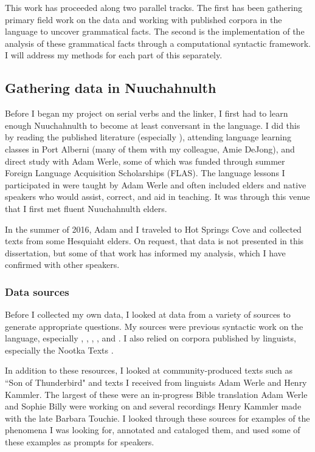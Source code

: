 This work has proceeded along two parallel tracks. The first has been gathering primary field work on the data and working with published corpora in the language to uncover grammatical facts. The second is the implementation of the analysis of these grammatical facts through a computational syntactic framework. I will address my methods for each part of this separately.

\subsection{Gathering data in Nuuchahnulth} \label{sec:method:ncn}

Before I began my project on serial verbs and the linker, I first had to learn enough Nuuchahnulth to become at least conversant in the language. I did this by reading the published literature (especially \citealt{sapir1939}), attending language learning classes in Port Alberni (many of them with my colleague, Amie DeJong), and direct study with Adam Werle, some of which was funded through summer Foreign Language Acquisition Scholarships (FLAS). The language lessons I participated in were taught by Adam Werle and often included elders and native speakers who would assist, correct, and aid in teaching. It was through this venue that I first met fluent Nuuchahnulth elders.

In the summer of 2016, Adam and I traveled to Hot Springs Cove and collected texts from some Hesquiaht elders. On request, that data is not presented in this dissertation, but some of that work has informed my analysis, which I have confirmed with other speakers.

\subsubsection{Data sources} \label{sec:method:sources}

Before I collected my own data, I looked at data from a variety of sources to generate appropriate questions. My sources were previous syntactic work on the language, especially \cite{jacobsen1993}, \cite{nakayama2001}, \cite{wojdak2003}, \cite{waldie2004}, and \cite{woo2007b}. I also relied on corpora published by linguists, especially the Nootka Texts \citep{sapir1924, sapir1939, sapir1955, whalingindians2000, whalingindians2004, whalingindians2009}.

In addition to these resources, I looked at community-produced texts such as ``Son of Thunderbird" and texts I received from linguists Adam Werle and Henry Kammler. The largest of these were an in-progress Bible translation Adam Werle and Sophie Billy were working on and several recordings Henry Kammler made with the late Barbara Touchie. I looked through these sources for examples of the phenomena I was looking for, annotated and cataloged them, and used some of these examples as prompts for speakers.

